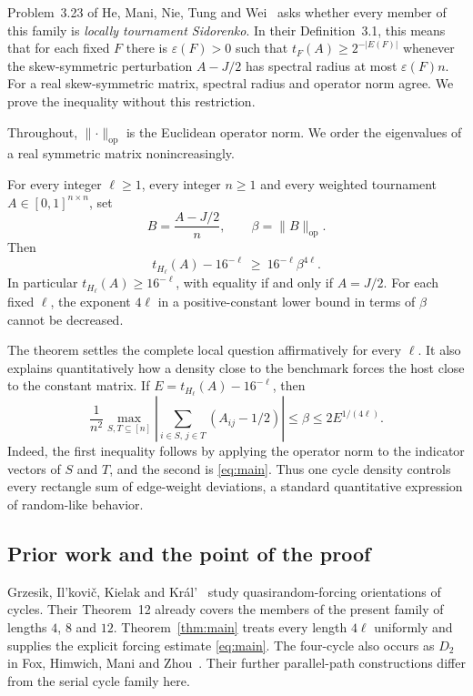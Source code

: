 \documentclass[acmsmall,screen,nonacm,11pt]{acmart}
\newcommand{\op}{\mathrm{op}}
\newcommand{\norm}[1]{\lVert #1\rVert}
\begin{document}
Problem~3.23 of He, Mani, Nie, Tung and Wei~\cite{HMNTW25} asks whether every member of this family is \emph{locally tournament Sidorenko}. In their Definition~3.1, this means that for each fixed $F$ there is $\varepsilon(F)>0$ such that $t_F(A)\geq2^{-|E(F)|}$ whenever the skew-symmetric perturbation $A-J/2$ has spectral radius at most $\varepsilon(F)n$. For a real skew-symmetric matrix, spectral radius and operator norm agree. We prove the inequality without this restriction.

Throughout, $\norm{\cdot}_{\op}$ is the Euclidean operator norm. We order the eigenvalues of a real symmetric matrix nonincreasingly.

\begin{theorem}\label{thm:main}
For every integer $\ell\geq1$, every integer $n\geq1$ and every weighted tournament $A\in[0,1]^{n\times n}$, set
\[
 B=\frac{A-J/2}{n},\qquad \beta=\norm{B}_{\op}.
\]
Then
\begin{equation}\label{eq:main}
 t_{H_\ell}(A)-16^{-\ell}\ \geq\ 16^{-\ell}\beta^{4\ell}.
\end{equation}
In particular $t_{H_\ell}(A)\geq16^{-\ell}$, with equality if and only if $A=J/2$. For each fixed $\ell$, the exponent $4\ell$ in a positive-constant lower bound in terms of $\beta$ cannot be decreased.
\end{theorem}

The theorem settles the complete local question affirmatively for every $\ell$. It also explains quantitatively how a density close to the benchmark forces the host close to the constant matrix. If $E=t_{H_\ell}(A)-16^{-\ell}$, then
\begin{equation}\label{eq:forcing}
 \frac{1}{n^2}\max_{S,T\subseteq[n]}
   \left|\sum_{i\in S,\,j\in T}(A_{ij}-1/2)\right|
 \leq\beta\leq 2E^{1/(4\ell)}.
\end{equation}
Indeed, the first inequality follows by applying the operator norm to the indicator vectors of $S$ and $T$, and the second is \eqref{eq:main}. Thus one cycle density controls every rectangle sum of edge-weight deviations, a standard quantitative expression of random-like behavior.

\subsection{Prior work and the point of the proof}

Grzesik, Il'kovi\v{c}, Kielak and Kr\'al'~\cite{GIKK23} study quasirandom-forcing orientations of cycles. Their Theorem~12 already covers the members of the present family of lengths $4$, $8$ and $12$. Theorem~\ref{thm:main} treats every length $4\ell$ uniformly and supplies the explicit forcing estimate \eqref{eq:main}. The four-cycle also occurs as $D_2$ in Fox, Himwich, Mani and Zhou~\cite[Lemma~4.10]{FHMZ24}. Their further parallel-path constructions differ from the serial cycle family here.
\end{document}
